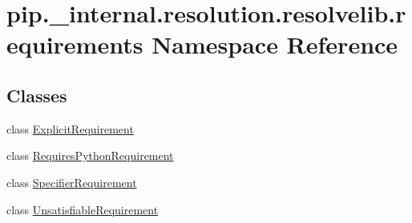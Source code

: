 \hypertarget{namespacepip_1_1__internal_1_1resolution_1_1resolvelib_1_1requirements}{}\section{pip.\+\_\+internal.\+resolution.\+resolvelib.\+requirements Namespace Reference}
\label{namespacepip_1_1__internal_1_1resolution_1_1resolvelib_1_1requirements}
\subsection*{Classes}
\begin{DoxyCompactItemize}
\item 
class \hyperlink{classpip_1_1__internal_1_1resolution_1_1resolvelib_1_1requirements_1_1ExplicitRequirement}{Explicit\+Requirement}
\item 
class \hyperlink{classpip_1_1__internal_1_1resolution_1_1resolvelib_1_1requirements_1_1RequiresPythonRequirement}{Requires\+Python\+Requirement}
\item 
class \hyperlink{classpip_1_1__internal_1_1resolution_1_1resolvelib_1_1requirements_1_1SpecifierRequirement}{Specifier\+Requirement}
\item 
class \hyperlink{classpip_1_1__internal_1_1resolution_1_1resolvelib_1_1requirements_1_1UnsatisfiableRequirement}{Unsatisfiable\+Requirement}
\end{DoxyCompactItemize}
